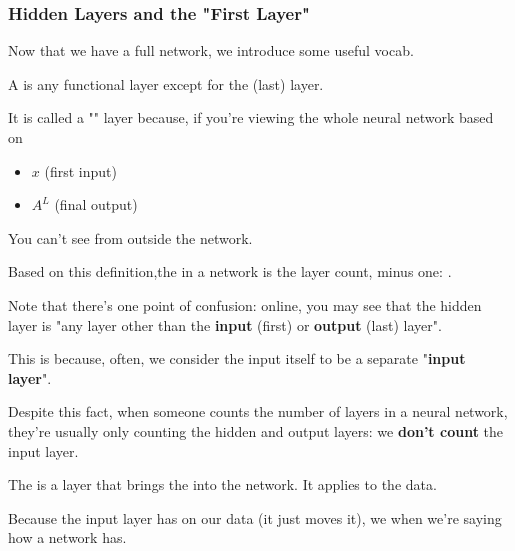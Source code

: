     \subsubsection{Hidden Layers and the "First Layer"}
        
        Now that we have a full network, we introduce some useful vocab.\\
        
        \begin{definition}
            A  is any functional layer except for the  (last) layer.
            
            It is called a "" layer because, if you're viewing the whole neural network based on
            
            \begin{itemize}
                \item {} $x$ (first input)
                
                \item {} $A^L$ (final output)
            \end{itemize}
            
            You can't see  from outside the network.

            Based on this definition,the  in a network is the layer count, minus one: .
        \end{definition}
        
        Note that there's one point of confusion: online, you may see that the hidden layer is "any layer other than the \textbf{input} (first) or \textbf{output} (last) layer".

        This is because, often, we consider the input itself to be a separate "\textbf{input layer}". 
        
        Despite this fact, when someone counts the number of layers in a neural network, they're usually only counting the hidden and output layers: we \textbf{don't count} the input layer.
            \\

        \begin{definition}
            The  is a layer that brings the  into the network. It applies  to the data.

            Because the input layer has  on our data (it just moves it), we  when we're saying how  a network has.
        \end{definition}

